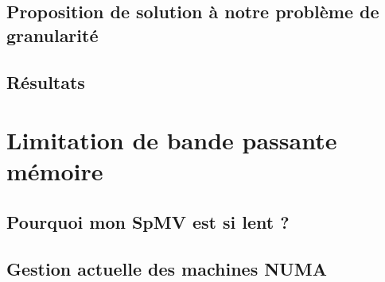 \documentclass[oneside,12t]{classes/Thesis}
\begin{document}
\section{Proposition de solution à notre problème de granularité}











\section{Résultats}









\chapter{Limitation de bande passante mémoire}
\minitoc
\vspace{1cm}

\section{Pourquoi mon SpMV est si lent ?}




\section{Gestion actuelle des machines NUMA}






\end{document}
